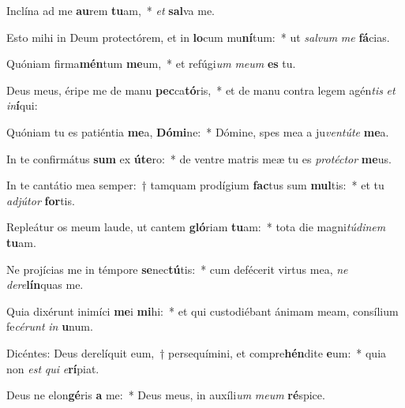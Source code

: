 \item Inclína ad me \textbf{au}rem \textbf{tu}am,~* \textit{et} \textbf{sal}va me.
\item Esto mihi in Deum protectórem, et in \textbf{lo}cum mu\textbf{ní}tum:~* ut \textit{sal}\textit{vum} \textit{me} \textbf{fá}cias.
\item Quóniam firma\textbf{mén}tum \textbf{me}um,~* et refúgi\textit{um} \textit{me}\textit{um} \textbf{es} tu.
\item Deus meus, éripe me de manu \textbf{pec}ca\textbf{tó}ris,~* et de manu contra legem agén\textit{tis} \textit{et} \textit{in}\textbf{í}qui:
\item Quóniam tu es patiéntia \textbf{me}a, \textbf{Dó}\textbf{mi}ne:~* Dómine, spes mea a ju\textit{ven}\textit{tú}\textit{te} \textbf{me}a.
\item In te confirmátus \textbf{sum} ex \textbf{ú}\textbf{te}ro:~* de ventre matris meæ tu es \textit{pro}\textit{téc}\textit{tor} \textbf{me}us.
\item In te cantátio mea semper:~† tamquam prodígium \textbf{fac}tus sum \textbf{mul}tis:~* et tu \textit{ad}\textit{jú}\textit{tor} \textbf{for}tis.
\item Repleátur os meum laude, ut cantem \textbf{gló}riam \textbf{tu}am:~* tota die magni\textit{tú}\textit{di}\textit{nem} \textbf{tu}am.
\item Ne projícias me in témpore \textbf{se}nec\textbf{tú}tis:~* cum defécerit virtus mea, \textit{ne} \textit{de}\textit{re}\textbf{lín}quas me.
\item Quia dixérunt inimíci \textbf{me}i \textbf{mi}hi:~* et qui custodiébant ánimam meam, consílium fe\textit{cé}\textit{runt} \textit{in} \textbf{u}num.
\item Dicéntes: Deus derelíquit eum,~† persequímini, et compre\textbf{hén}dite \textbf{e}um:~* quia non \textit{est} \textit{qui} \textit{e}\textbf{rí}piat.
\item Deus ne elon\textbf{gé}ris \textbf{a} me:~* Deus meus, in auxíli\textit{um} \textit{me}\textit{um} \textbf{ré}spice.
